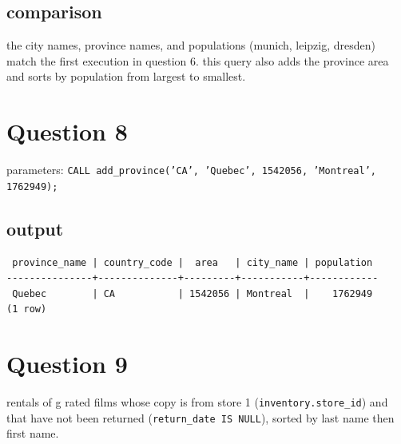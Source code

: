 \documentclass[11pt]{article}
\begin{document}
\subsection*{comparison}
the city names, province names, and populations (munich, leipzig, dresden) match the first
execution in question 6. this query also adds the province area and sorts by population from
largest to smallest.

\section*{Question 8}

parameters: \texttt{CALL add\_province('CA', 'Quebec', 1542056, 'Montreal', 1762949);}

\subsection*{output}
{\small
\begin{verbatim}
 province_name | country_code |  area   | city_name | population
---------------+--------------+---------+-----------+------------
 Quebec        | CA           | 1542056 | Montreal  |    1762949
(1 row)
\end{verbatim}
}

\section*{Question 9}

rentals of g rated films whose copy is from store 1 (\texttt{inventory.store\_id}) and that have
not been returned (\texttt{return\_date IS NULL}), sorted by last name then first name.
\end{document}
